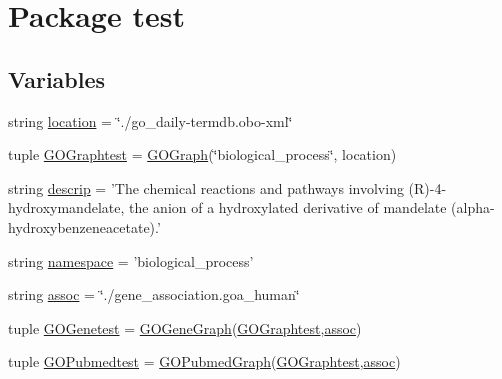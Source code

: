 \hypertarget{namespacetest}{
\section{Package test}
\label{namespacetest}
}
\subsection*{Variables}
\begin{DoxyCompactItemize}
\item 
string \hyperlink{namespacetest_a4ee7d63d9426ae32ba96ad2f0e171511}{location} = \char`\"{}./go\_\-daily-\/termdb.obo-\/xml\char`\"{}
\item 
tuple \hyperlink{namespacetest_a49256f3800de70e9aabf11ea0c3bb8e1}{GOGraphtest} = \hyperlink{class_g_o_graph_1_1_g_o_graph}{GOGraph}(\char`\"{}biological\_\-process\char`\"{}, location)
\item 
string \hyperlink{namespacetest_afe7b4432163ad853f4fcd650d0ecab8c}{descrip} = 'The chemical reactions and pathways involving (R)-\/4-\/hydroxymandelate, the anion of a hydroxylated derivative of mandelate (alpha-\/hydroxybenzeneacetate).'
\item 
string \hyperlink{namespacetest_a1429061289985226ca44c2e4e888d77e}{namespace} = 'biological\_\-process'
\item 
string \hyperlink{namespacetest_adb8b1e2a5df72522e42bc012571e75cd}{assoc} = \char`\"{}./gene\_\-association.goa\_\-human\char`\"{}
\item 
tuple \hyperlink{namespacetest_ab48a47ac8dcf21d32cff24c492f085c1}{GOGenetest} = \hyperlink{class_g_o_gene_graph_1_1_g_o_gene_graph}{GOGeneGraph}(\hyperlink{namespacetest_a49256f3800de70e9aabf11ea0c3bb8e1}{GOGraphtest},\hyperlink{namespacetest_adb8b1e2a5df72522e42bc012571e75cd}{assoc})
\item 
tuple \hyperlink{namespacetest_a2565076d50762c7d466830ecbabb1671}{GOPubmedtest} = \hyperlink{class_g_o_pubmed_graph_1_1_g_o_pubmed_graph}{GOPubmedGraph}(\hyperlink{namespacetest_a49256f3800de70e9aabf11ea0c3bb8e1}{GOGraphtest},\hyperlink{namespacetest_adb8b1e2a5df72522e42bc012571e75cd}{assoc})
\end{DoxyCompactItemize}


